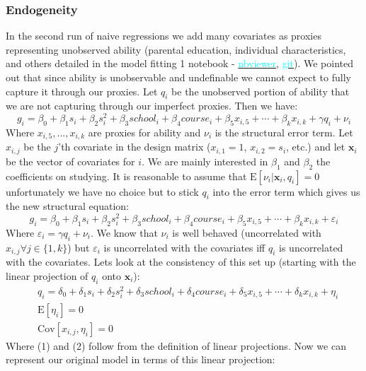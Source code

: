 \documentclass[12pt]{article}
\newcommand{\E}{\mathrm{E}}
\newcommand{\Cov}{\mathrm{Cov}}
\begin{document}
\subsubsection{Endogeneity} \label{endogeneity}
In the second run of naive regressions we add many covariates as proxies representing unobserved ability (parental education, individual characteristics, and others detailed in the model fitting 1 notebook - \href{https://nbviewer.jupyter.org/github/nadavtadelis/Reproducible_Metrics/blob/master/model_fitting_1.ipynb}{\textcolor{cyan}{nbviewer}}, \href{https://github.com/nadavtadelis/Reproducible_Metrics/blob/master/model_fitting_1.ipynb}{\textcolor{cyan}{git}}). We pointed out that since ability is unobservable and undefinable we cannot expect to fully capture it through our proxies. Let $q_i$ be the unobserved portion of ability that we are not capturing through our imperfect proxies. Then we have:
$$
g_i = \beta_0 + \beta_1 s_i + \beta_2 s_i^2 + \beta_3 school_i + \beta_4 course_i + \beta_5 x_{i,5} + \cdots + \beta_k x_{i,k} + \gamma q_i + \nu_i
$$
Where $x_{i,5}, ..., x_{i,k}$ are proxies for ability and $\nu_i$ is the structural error term. Let $x_{i,j}$ be the $j$'th covariate in the design matrix ($x_{i,1} = 1$, $x_{i,2} = s_i$, etc.) and let $\bm{x}_i$ be the vector of covariates for $i$. We are mainly interested in $\beta_1$ and $\beta_2$ the coefficients on studying. It is reasonable to assume that $\E[\nu_i | \bm{x}_i, q_i] = 0$ unfortunately we have no choice but to stick $q_i$ into the error term which gives us the new structural equation:
$$
g_i = \beta_0 + \beta_1 s_i + \beta_2 s_i^2 + \beta_3 school_i + \beta_4 course_i + \beta_5 x_{i,5} + \cdots + \beta_k x_{i,k} + \varepsilon_i
$$
Where $\varepsilon_i = \gamma q_i + \nu_i$. We know that $\nu_i$ is well behaved (uncorrelated with $x_{i,j} \forall j \in \{1,k\}$) but $\varepsilon_i$ is uncorrelated with the covariates iff $q_i$ is uncorrelated with the covariates. Lets look at the consistency of this set up (starting with the linear projection of $q_i$ onto $\bm{x}_i$):
\begin{align}
&q_i = \delta_0 + \delta_1 s_i + \delta_2 s_i^2 + \delta_3 school_i + \delta_4 course_i + \delta_5 x_{i,5} + \cdots + \delta_k x_{i,k} + \eta_i  \nonumber \\
&\E[\eta_i] = 0 \\
&\Cov[x_{i,j}, \eta_i] = 0
\end{align}
Where (1) and (2) follow from the definition of linear projections. Now we can represent our original model in terms of this linear projection:
\end{document}
